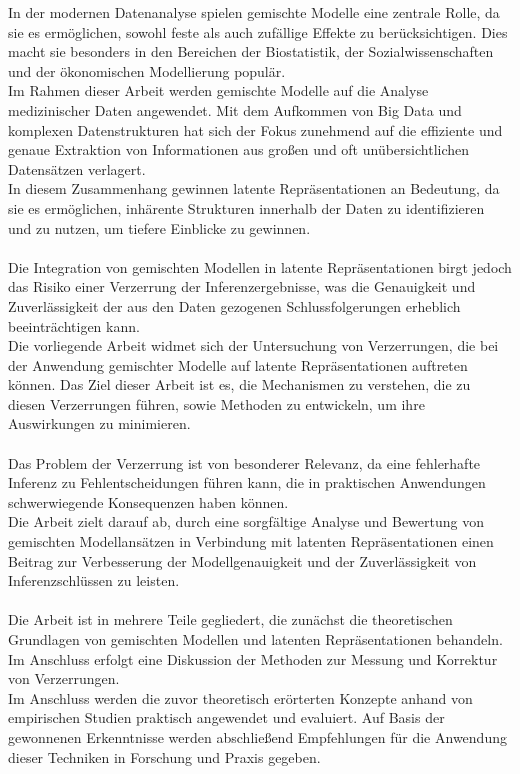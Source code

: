 \documentclass[%
thesis=student,%
coverpage=false,%
titlepage=false,%
headmarks=true, %
german,%
font=libertine, %
math=newpxtx, %
BCOR=5mm,%
coverBCOR=11mm%
]{tumbook}
\theoremstyle{break}
\begin{document}
In der modernen Datenanalyse spielen gemischte Modelle eine zentrale Rolle, da sie es ermöglichen, sowohl feste als auch zufällige Effekte zu berücksichtigen. Dies macht sie besonders in den Bereichen der Biostatistik, der Sozialwissenschaften und der ökonomischen Modellierung populär.\\ 
Im Rahmen dieser Arbeit werden gemischte Modelle auf die Analyse medizinischer Daten angewendet. Mit dem Aufkommen von Big Data und komplexen Datenstrukturen hat sich der Fokus zunehmend auf die effiziente und genaue Extraktion von Informationen aus großen und oft unübersichtlichen Datensätzen verlagert.\\ 
In diesem Zusammenhang gewinnen latente Repräsentationen an Bedeutung, da sie es ermöglichen, inhärente Strukturen innerhalb der Daten zu identifizieren und zu nutzen, um tiefere Einblicke zu gewinnen.\\
\\
Die Integration von gemischten Modellen in latente Repräsentationen birgt jedoch das Risiko einer Verzerrung der Inferenzergebnisse, was die Genauigkeit und Zuverlässigkeit der aus den Daten gezogenen Schlussfolgerungen erheblich beeinträchtigen kann.\\ 
Die vorliegende Arbeit widmet sich der Untersuchung von Verzerrungen, die bei der Anwendung gemischter Modelle auf latente Repräsentationen auftreten können. Das Ziel dieser Arbeit ist es, die Mechanismen zu verstehen, die zu diesen Verzerrungen führen, sowie Methoden zu entwickeln, um ihre Auswirkungen zu minimieren.\\
\\
Das Problem der Verzerrung ist von besonderer Relevanz, da eine fehlerhafte Inferenz zu Fehlentscheidungen führen kann, die in praktischen Anwendungen schwerwiegende Konsequenzen haben können.\\
Die Arbeit zielt darauf ab, durch eine sorgfältige Analyse und Bewertung von gemischten Modellansätzen in Verbindung mit latenten Repräsentationen einen Beitrag zur Verbesserung der Modellgenauigkeit und der Zuverlässigkeit von Inferenzschlüssen zu leisten.\\
\\
Die Arbeit ist in mehrere Teile gegliedert, die zunächst die theoretischen Grundlagen von gemischten Modellen und latenten Repräsentationen behandeln. Im Anschluss erfolgt eine Diskussion der Methoden zur Messung und Korrektur von Verzerrungen. \\
Im Anschluss werden die zuvor theoretisch erörterten Konzepte anhand von empirischen Studien praktisch angewendet und evaluiert. Auf Basis der gewonnenen Erkenntnisse werden abschließend Empfehlungen für die Anwendung dieser Techniken in Forschung und Praxis gegeben.\\
\\
\end{document}
